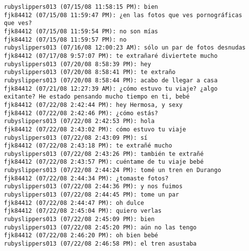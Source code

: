 \begin{verbatim}
rubyslippers013 (07/15/08 11:58:15 PM): bien
fjk84412 (07/15/08 11:59:47 PM): ¿en las fotos que ves pornográficas que ves?
fjk84412 (07/15/08 11:59:54 PM): no son mías
fjk84412 (07/15/08 11:59:57 PM): no
rubyslippers013 (07/16/08 12:00:23 AM): sólo un par de fotos desnudas
fjk84412 (07/17/08 9:57:07 PM): te extrañaré diviertete mucho
rubyslippers013 (07/20/08 8:58:39 PM): hey
rubyslippers013 (07/20/08 8:58:41 PM): te extraño
rubyslippers013 (07/20/08 8:58:44 PM): acabo de llegar a casa
fjk84412 (07/21/08 12:27:39 AM): ¿cómo estuvo tu viaje? ¿algo exitante? He estado pensando mucho tiempo en ti, bebé
fjk84412 (07/22/08 2:42:44 PM): hey Hermosa, y sexy
fjk84412 (07/22/08 2:42:46 PM): ¿cómo estás?
rubyslippers013 (07/22/08 2:42:53 PM): hola
fjk84412 (07/22/08 2:43:02 PM): cómo estuvo tu viaje
rubyslippers013 (07/22/08 2:43:09 PM): sí
fjk84412 (07/22/08 2:43:18 PM): te extrañé mucho
rubyslippers013 (07/22/08 2:43:26 PM): también te extrañé
fjk84412 (07/22/08 2:43:57 PM): cuéntame de tu viaje bebé
rubyslippers013 (07/22/08 2:44:24 PM): tomé un tren en Durango
fjk84412 (07/22/08 2:44:34 PM): ¿tomaste fotos?
rubyslippers013 (07/22/08 2:44:36 PM): y nos fuimos
rubyslippers013 (07/22/08 2:44:45 PM): tome un par
fjk84412 (07/22/08 2:44:47 PM): oh dulce
fjk84412 (07/22/08 2:45:04 PM): quiero verlas
rubyslippers013 (07/22/08 2:45:09 PM): bien
rubyslippers013 (07/22/08 2:45:20 PM): aún no las tengo
fjk84412 (07/22/08 2:46:20 PM): oh bien bebé
rubyslippers013 (07/22/08 2:46:58 PM): el tren asustaba

\end{verbatim}

